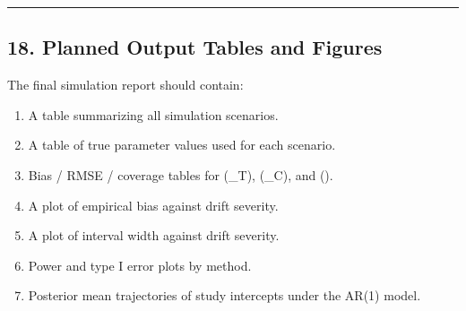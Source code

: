 \documentclass[
  letterpaper,
  DIV=11,
  numbers=noendperiod]{scrartcl}
\newenvironment{Shaded}{\begin{snugshade}}{\end{snugshade}}
\newcommand{\AttributeTok}[1]{\textcolor[rgb]{0.40,0.45,0.13}{#1}}
\newcommand{\ControlFlowTok}[1]{\textcolor[rgb]{0.00,0.23,0.31}{\textbf{#1}}}
\newcommand{\FunctionTok}[1]{\textcolor[rgb]{0.28,0.35,0.67}{#1}}
\newcommand{\NormalTok}[1]{\textcolor[rgb]{0.00,0.23,0.31}{#1}}
\newcommand{\OtherTok}[1]{\textcolor[rgb]{0.00,0.23,0.31}{#1}}
\newcommand{\SpecialCharTok}[1]{\textcolor[rgb]{0.37,0.37,0.37}{#1}}
\newcommand{\StringTok}[1]{\textcolor[rgb]{0.13,0.47,0.30}{#1}}
\providecommand{\tightlist}{%
  \setlength{\itemsep}{0pt}\setlength{\parskip}{0pt}}
\begin{document}
\begin{Shaded}
\end{Shaded}

\begin{center}\rule{0.5\linewidth}{0.5pt}\end{center}

\subsection{18. Planned Output Tables and
Figures}\label{planned-output-tables-and-figures}

The final simulation report should contain:

\begin{enumerate}
\def\labelenumi{\arabic{enumi}.}
\tightlist
\item
  A table summarizing all simulation scenarios.
\item
  A table of true parameter values used for each scenario.
\item
  Bias / RMSE / coverage tables for (\mu\_T), (\mu\_C), and (\Delta).
\item
  A plot of empirical bias against drift severity.
\item
  A plot of interval width against drift severity.
\item
  Power and type I error plots by method.
\item
  Posterior mean trajectories of study intercepts under the AR(1) model.
\end{enumerate}
\end{document}
